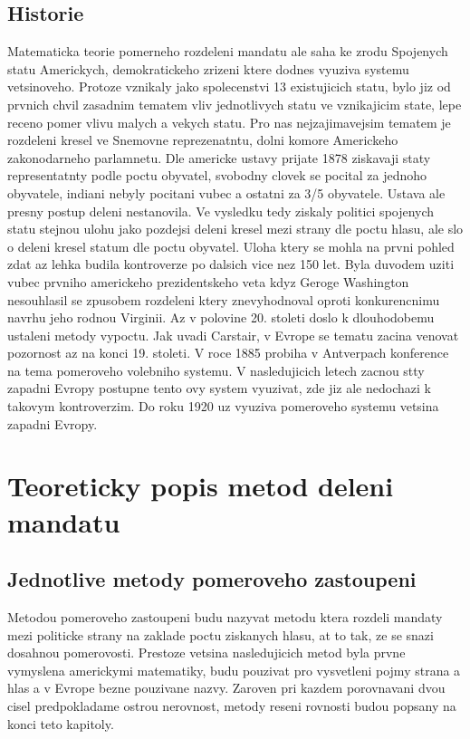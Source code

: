 \documentclass[12pt,a4paper]{scrreprt}
\begin{document}
\section{Historie}
Matematicka teorie pomerneho rozdeleni mandatu ale saha ke zrodu Spojenych statu Americkych, demokratickeho zrizeni ktere dodnes vyuziva systemu vetsinoveho.\autocite{BAL2}
Protoze vznikaly jako spolecenstvi 13 existujicich statu, bylo jiz od prvnich chvil zasadnim tematem vliv jednotlivych statu ve vznikajicim state, lepe receno pomer vlivu malych a vekych statu.
Pro nas nejzajimavejsim tematem je rozdeleni kresel ve Snemovne reprezenatntu, dolni komore Americkeho zakonodarneho parlamnetu.
Dle americke ustavy prijate 1878 ziskavaji staty representatnty podle poctu obyvatel, svobodny clovek se pocital za jednoho obyvatele, indiani nebyly pocitani vubec a ostatni za 3/5 obyvatele.\autocite{CON}
Ustava ale presny postup deleni nestanovila.
Ve vysledku tedy ziskaly politici spojenych statu stejnou ulohu jako pozdejsi deleni kresel mezi strany dle poctu hlasu, ale slo o deleni kresel statum dle poctu obyvatel. 
Uloha ktery se mohla na prvni pohled zdat az lehka budila kontroverze po dalsich vice nez 150 let.
Byla duvodem uziti vubec prvniho americkeho prezidentskeho veta kdyz Geroge Washington nesouhlasil se zpusobem rozdeleni ktery znevyhodnoval oproti konkurencnimu navrhu jeho rodnou Virginii.\autocite{BAL1}
Az v polovine 20. stoleti doslo k dlouhodobemu ustaleni metody vypoctu.
Jak uvadi Carstair, v Evrope se tematu zacina venovat pozornost az na konci 19. stoleti.
V roce 1885 probiha v Antverpach konference na tema pomeroveho volebniho systemu.
V nasledujicich letech zacnou stty zapadni Evropy postupne tento ovy system vyuzivat, zde jiz ale nedochazi k takovym kontroverzim.
Do roku 1920 uz vyuziva pomeroveho systemu vetsina zapadni Evropy.\autocite{BOO}

\chapter{Teoreticky popis metod deleni mandatu}
\section{Jednotlive metody pomeroveho zastoupeni}
Metodou pomeroveho zastoupeni budu nazyvat metodu ktera rozdeli mandaty mezi politicke strany na zaklade poctu ziskanych hlasu, at to tak, ze se snazi dosahnou pomerovosti.
Prestoze vetsina nasledujicich metod byla prvne vymyslena americkymi matematiky, budu pouzivat pro vysvetleni pojmy strana a hlas a v Evrope bezne pouzivane nazvy.
Zaroven pri kazdem porovnavani dvou cisel predpokladame ostrou nerovnost, metody reseni rovnosti budou popsany na konci teto kapitoly.
\end{document}
